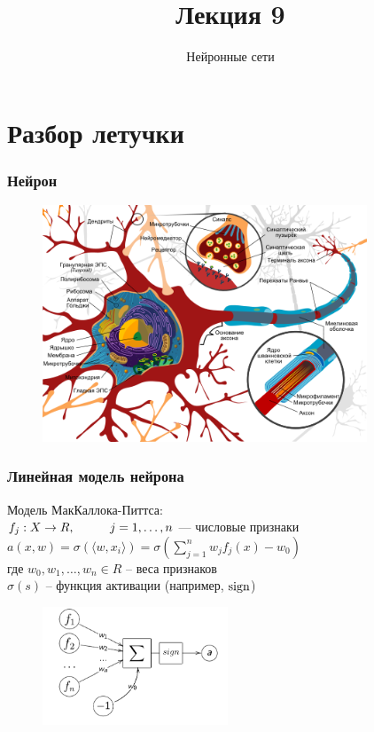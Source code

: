 \documentclass[10pt]{beamer}
\title{Лекция 9}
\subtitle{Нейронные сети}
\begin{document}
	

\section{Разбор летучки}

\frame{\titlepage}

\begin{frame}\frametitle{Нейрон}
	\begin{figure}[htbp]
	  \includegraphics[height=200pt, keepaspectratio = true]{images/neuron}   
	\end{figure}
\end{frame}

\begin{frame}\frametitle{Линейная модель нейрона}
	Модель МакКаллока-Питтса:\\
	$f_j: X \rightarrow R, \hspace{10mm} j = 1,\dots, n$ — числовые признаки\\
	$a(x,w) = \sigma(\langle w, x_i \rangle) = \sigma(\sum\limits_{j=1}^n w_j f_j(x) - w_0)$\\
	где $w_0, w_1, \dots,w_n \in R$ -- веса признаков\\
	$\sigma(s)$ -- функция активации (например, $\operatorname{sign}$)
	
	\begin{figure}[htbp]
	  \includegraphics[height=100pt, keepaspectratio = true]{images/neuron-scheme}   
	\end{figure}
\end{frame}
\end{document}
